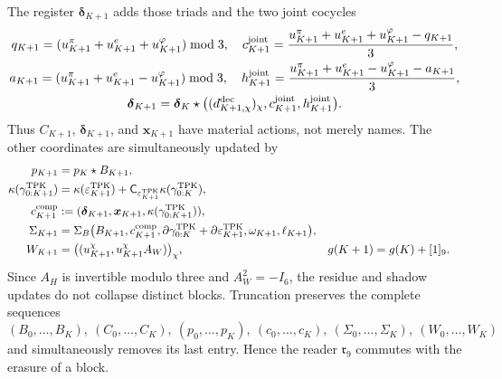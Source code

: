 The register \(\boldsymbol\delta_{K+1}\) adds those triads and the two joint
cocycles
\begin{equation}
\label{eq:continuo-comun-update-triadas-carry-conjunto}
 \begin{gathered}
 q_{K+1}=(u_{K+1}^\pi+u_{K+1}^e+u_{K+1}^\varphi)\bmod3,
 \quad
 c_{K+1}^{\rm joint}=\frac{u_{K+1}^\pi+u_{K+1}^e+u_{K+1}^\varphi-q_{K+1}}3,\\
 a_{K+1}=(u_{K+1}^\pi+u_{K+1}^e-u_{K+1}^\varphi)\bmod3,
 \quad
 h_{K+1}^{\rm joint}=\frac{u_{K+1}^\pi+u_{K+1}^e-u_{K+1}^\varphi-a_{K+1}}3,\\
 \boldsymbol\delta_{K+1}
 =\boldsymbol\delta_K\star
 \bigl((d_{K+1,\chi}^{\rm dec})_\chi,
       c_{K+1}^{\rm joint},h_{K+1}^{\rm joint}\bigr).
 \end{gathered}
\end{equation}
Thus \(C_{K+1}\), \(\boldsymbol\delta_{K+1}\), and
\(\boldsymbol x_{K+1}\) have material actions, not merely names.
The other coordinates are simultaneously updated by
\begin{align}
 p_{K+1}&=p_K\star B_{K+1},
 \label{eq:continuo-comun-update-prefijo-tpk}\\
 \kappa(\gamma^{\rm TPK}_{0:K+1})
 &=\kappa(\varepsilon^{\rm TPK}_{K+1})
   +\mathsf C_{\varepsilon^{\rm TPK}_{K+1}}
    \kappa(\gamma^{\rm TPK}_{0:K}),
 \label{eq:continuo-comun-update-carry-lector-tpk}\\
 c_{K+1}^{\rm comp}
 &:=(\boldsymbol\delta_{K+1},\boldsymbol x_{K+1},
       \kappa(\gamma^{\rm TPK}_{0:K+1})),
 \label{eq:continuo-comun-update-carry-compacto-tpk}\\
 \Sigma_{K+1}
 &=\Sigma_B\bigl(
 B_{K+1},c_{K+1}^{\rm comp},
 \partial\gamma^{\rm TPK}_{0:K}
 +\partial\varepsilon^{\rm TPK}_{K+1},
 \omega_{K+1},\ell_{K+1}\bigr),
 \label{eq:continuo-comun-update-firma-tpk}\\
 W_{K+1}
 &=\bigl((u_{K+1}^\chi,u_{K+1}^\chi A_W)\bigr)_\chi,
 &g(K+1)&=g(K)+[1]_9.
 \label{eq:continuo-comun-update-witt-fase-tpk}
\end{align}
Since \(A_H\) is invertible modulo three and \(A_W^2=-I_6\), the residue
and shadow updates do not collapse distinct blocks. Truncation preserves
the complete sequences
\[
 (B_0,\ldots,B_K),\ (C_0,\ldots,C_K),\
 (p_0,\ldots,p_K),\ (c_0,\ldots,c_K),\
 (\Sigma_0,\ldots,\Sigma_K),\ (W_0,\ldots,W_K)
\]
and simultaneously removes its last entry. Hence the reader
\(\mathfrak r_9\) commutes with the erasure of a block.

